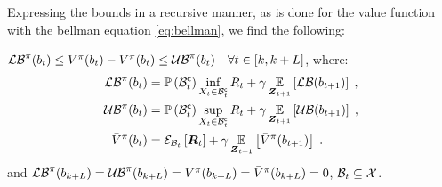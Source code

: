 Expressing the bounds in a recursive manner, as is done for the value function with the bellman equation \eqref{eq:bellman}, we find the following:
\begin{corollaryE}
	\label{thm:val_func_bounds_states_bellman}
	$\lowerbound^\pi(\blf{t})\leq V^\pi(\blf{t})-\bar{V}^\pi(\blf{t})\leq\upperbound^\pi(\blf{t})\quad\forall t\in[k,k+L]$, where:
	\begin{subequations}
		\begin{align}
			\lowerbound\nolimits^\pi(\blf{t}) & =\measure{\stcompI{\subSpace}{t}}\inf_{\states{t}\in\stcompI{\subSpace}{t}}R_t+\gamma\expectation{\lowerbound(\blf{t+1})}{\observationsRV{t+1}}\;,\\
			\upperbound\nolimits^\pi(\blf{t}) & =\measure{\stcompI{\subSpace}{t}}\sup_{\states{t}\in\stcompI{\subSpace}{t}}R_t+\gamma\expectation{\upperbound(\blf{t+1})}{\observationsRV{t+1}}\;,\\
			\bar{V}^\pi(\blf{t}) & =\partialexpectation{\boldsymbol{R}_t}{\subSpaceI{t}}
			+\gamma\expectation{\bar{V}^\pi(\blf{t+1})}{\observationsRV{t+1}}\;.
		\end{align}
	\end{subequations}
	and $\lowerbound^\pi(\blf{k+L})=\upperbound^\pi(\blf{k+L})=V^\pi(\blf{k+L})=\bar{V}^\pi(\blf{k+L})=0$, $\subSpaceI{t}\subseteq\stateSpace$.
\end{corollaryE}
